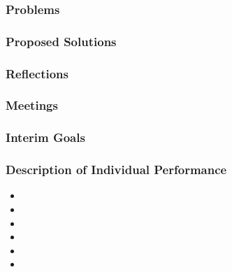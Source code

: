 \subsubsection{Problems}


\subsubsection{Proposed Solutions}


\subsubsection{Reflections}


\subsubsection{Meetings}


\subsubsection{Interim Goals}


\subsubsection{Description of Individual Performance}
    \begin{itemize}
      \item \performance{\martin}{
        
      }
      
      \item \performance{\felix}{
        
      }
      
      \item \performance{\hannes}{
        
      }
      
      \item \performance{\arvid}{
        
      }
      
      \item \performance{\marcus}{
        
      }
      
      \item \performance{\jakob}{
        
      }
    \end{itemize}
